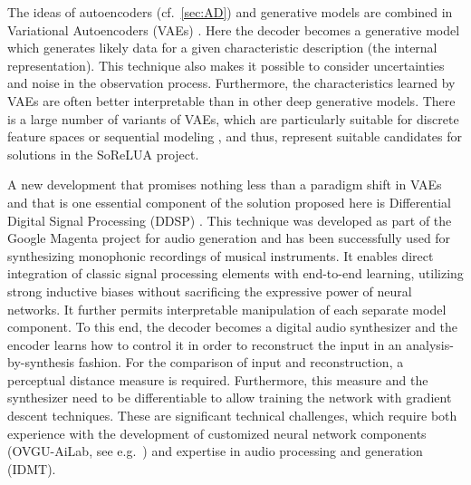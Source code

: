 \documentclass[11pt]{article}
\newcommand{\todo}[1]{\textcolor{red}{#1}}
\begin{document}
The ideas of autoencoders (cf.~\ref{sec:AD}) and generative models are combined in Variational Autoencoders (VAEs) \cite{kingma2013vae,rezende2014vae}. 
Here the decoder becomes a generative model which generates likely data for a given characteristic description (the internal representation). 
This technique also makes it possible to consider uncertainties and noise in the observation process. 
Furthermore, the characteristics learned by VAEs are often better interpretable than in other deep generative models.
There is a large number of variants of VAEs, which are particularly suitable for discrete feature spaces \cite{vandenoord2017vqvae,razavi2019vqvae2} or sequential modeling \cite{gregor2018tdvae}, and thus, represent suitable candidates for solutions in the SoReLUA project.

A new development that promises nothing less than a paradigm shift in VAEs and that is one essential component of the solution proposed here is Differential Digital Signal Processing (DDSP) \cite{engel2020ddsp}. 
This technique was developed as part of the Google Magenta project for audio generation and has been successfully used for synthesizing monophonic recordings of musical instruments. 
It enables direct integration of classic signal processing elements with end-to-end learning, utilizing strong inductive biases without sacrificing the expressive power of neural networks.
It further permits interpretable manipulation of each separate model component. 
To this end, the decoder becomes a digital audio synthesizer and the encoder learns how to control it in order to reconstruct the input in an analysis-by-synthesis fashion.
For the comparison of input and reconstruction, a perceptual distance measure is required.
Furthermore, this measure and the synthesizer need to be differentiable to allow training the network with gradient descent techniques.
These are significant technical challenges, which require both experience with the development of customized neural network components (OVGU-AiLab, see e.g.~\cite{stober2015arXiv:1511.04306}) and expertise in audio processing and generation (IDMT). 


\end{document}
